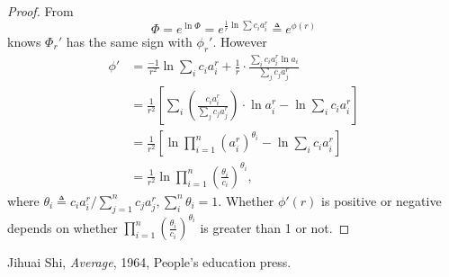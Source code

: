 \documentclass[12pt,a4paper,reqno]{amsart}
\theoremstyle{plain}
\theoremstyle{definition}
\begin{document}
\begin{proof}
  From $$\Phi=e^{\ln\Phi}=e^{\frac{1}{r}\ln\sum c_i a_i^r} \triangleq e^{\phi(r)}$$ knows $\Phi_r'$ has the same sign with $\phi_r'$. However
\begin{equation*}
\begin{split}
  \phi' & = \frac{-1}{r^2}\ln\sum_i c_i a_i^r + \frac{1}{r}\cdot\frac{\sum_i c_i a_i^r\ln a_i}{\sum_j c_j a_j^r} \\
        & = \frac{1}{r^2} \left[\sum_i  \left(\frac{c_i a_i^r}{\sum_j c_j a_j^r}\right)\cdot \ln a_i^r-\ln\sum_i c_i a_i^r \right] \\ 
        & = \frac{1}{r^2} \left[\ln \prod_{i=1}^n \left(a_i^r\right)^{\theta_i} - \ln\sum_i c_i a_i^r \right] \\
        & = \frac{1}{r^2} \ln\prod_{i=1}^n \left(\frac{\theta_i}{c_i}\right)^{\theta_i}, 
\end{split}
\end{equation*}
where $\theta_i\triangleq c_i a_i^r / \sum\limits_{j=1}^n c_j a_j^r, \sum\limits_i^n \theta_i = 1$. Whether $\phi'(r)$ is positive or negative depends on whether $\prod\limits_{i=1}^n\left(\frac{\theta_i}{c_i} \right)^{\theta_i}$ is greater than 1 or not. 





\end{proof}

\begin{thebibliography}{99} 

 Jihuai Shi, \textit{Average}, 1964, People's education press.  


\end{thebibliography}
\end{document}
